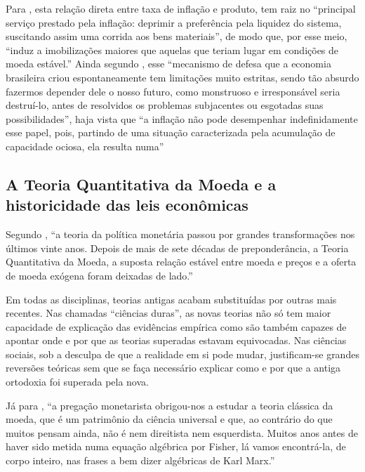 \documentclass[
	10pt,				%
	openright,			%
	twoside,			%
	a5paper,			%
	english,			%
	french,				%
	spanish,			%
	brazil				%
	]{abntex2}
\renewenvironment{quote}
  {\small\list{}{\rightmargin=0.1cm \leftmargin=4cm}%
   \item\relax}
  {\endlist}
\begin{document}
Para , esta relação direta entre taxa de
inflação e produto, tem raiz no ``principal serviço prestado pela
inflação: deprimir a preferência pela liquidez do sistema, suscitando
assim uma corrida aos bens materiais'', de modo que, por esse meio,
``induz a imobilizações maiores que aquelas que teriam lugar em
condições de moeda estável.'' Ainda segundo
, esse ``mecanismo de defesa que a
economia brasileira criou espontaneamente tem limitações muito estritas,
sendo tão absurdo fazermos depender dele o nosso futuro, como monstruoso
e irresponsável seria destruí-lo, antes de resolvidos os problemas
subjacentes ou esgotadas suas possibilidades'', haja vista que ``a
inflação não pode desempenhar indefinidamente esse papel, pois, partindo
de uma situação caracterizada pela acumulação de capacidade ociosa, ela
resulta numa''

\subsection{A Teoria Quantitativa da Moeda e a historicidade das leis
econômicas}\label{a-teoria-quantitativa-da-moeda-e-a-historicidade-das-leis-econuxf4micas}

Segundo , ``a teoria da política
monetária passou por grandes transformações nos últimos vinte anos.
Depois de mais de sete décadas de preponderância, a Teoria Quantitativa
da Moeda, a suposta relação estável entre moeda e preços e a oferta de
moeda exógena foram deixadas de lado.''

\begin{quote}
Em todas as disciplinas, teorias antigas acabam substituídas por outras
mais recentes. Nas chamadas ``ciências duras'', as novas teorias não só
tem maior capacidade de explicação das evidências empírica como são
também capazes de apontar onde e por que as teorias superadas estavam
equivocadas. Nas ciências sociais, sob a desculpa de que a realidade em
si pode mudar, justificam-se grandes reversões teóricas sem que se faça
necessário explicar como e por que a antiga ortodoxia foi superada pela
nova.
\end{quote}

Já para , ``a pregação monetarista
obrigou-nos a estudar a teoria clássica da moeda, que é um patrimônio da
ciência universal e que, ao contrário do que muitos pensam ainda, não é
nem direitista nem esquerdista. Muitos anos antes de haver sido metida
numa equação algébrica por Fisher, lá vamos encontrá-la, de corpo
inteiro, nas frases a bem dizer algébricas de Karl Marx.''
\end{document}

